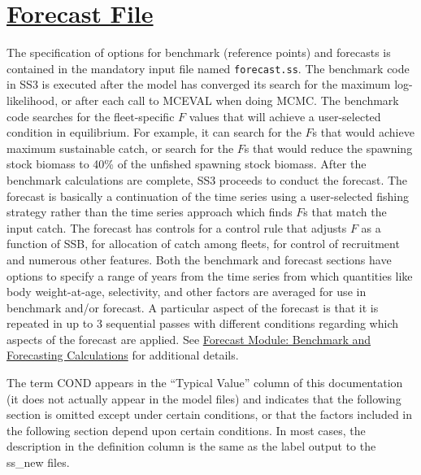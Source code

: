 \hypertarget{ForecastFile}{}
\section[Forecast File]{\protect\hyperlink{ForecastFile}{Forecast File}}
The specification of options for benchmark (reference points) and forecasts is contained in the mandatory input file named \texttt{forecast.ss}. The benchmark code in SS3 is executed after the model has converged its search for the maximum log-likelihood, or after each call to MCEVAL when doing MCMC. The benchmark code searches for the fleet-specific $F$ values that will achieve a user-selected condition in equilibrium. For example, it can search for the $F$s that would achieve maximum sustainable catch, or search for the $F$s that would reduce the spawning stock biomass to 40\% of the unfished spawning stock biomass. After the benchmark calculations are complete, SS3 proceeds to conduct the forecast. The forecast is basically a continuation of the time series using a user-selected fishing strategy rather than the time series approach which finds $F$s that match the input catch. The forecast has controls for a control rule that adjusts $F$ as a function of SSB, for allocation of catch among fleets, for control of recruitment and numerous other features. Both the benchmark and forecast sections have options to specify a range of years from the time series from which quantities like body weight-at-age, selectivity, and other factors are averaged for use in benchmark and/or forecast. A particular aspect of the forecast is that it is repeated in up to 3 sequential passes with different conditions regarding which aspects of the forecast are applied. See \hyperref[sec:forecast]{Forecast Module: Benchmark and Forecasting Calculations} for additional details.

The term COND appears in the ``Typical Value'' column of this documentation (it does not actually appear in the model files) and indicates that the following section is omitted except under certain conditions, or that the factors included in the following section depend upon certain conditions. In most cases, the description in the definition column is the same as the label output to the ss\_new files.


